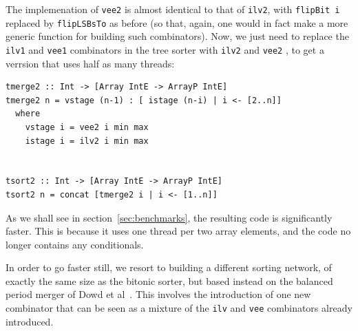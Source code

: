The implemenation of {\tt vee2} is almost identical to
that of {\tt ilv2}, with {\tt flipBit i}
replaced by {\tt flipLSBsTo} as before (so that, again, one would in
fact make a more generic function for building such combinators).
Now, we just need to replace the {\tt ilv1} and {\tt vee1} combinators
in the tree sorter with {\tt ilv2} and {\tt vee2} , to get a verrsion that uses half as many threads:
\begin{codesize}
\begin{verbatim}
tmerge2 :: Int -> [Array IntE -> ArrayP IntE]
tmerge2 n = vstage (n-1) : [ istage (n-i) | i <- [2..n]]
  where
    vstage i = vee2 i min max
    istage i = ilv2 i min max


tsort2 :: Int -> [Array IntE -> ArrayP IntE]
tsort2 n = concat [tmerge2 i | i <- [1..n]]
\end{verbatim}
\end{codesize}
As we shall see in section~\ref{sec:benchmarks}, the resulting code
is significantly faster. This is because it uses one thread per two array elements,
and the code no longer contains any conditionals.

In order to go faster still, we resort to building a different sorting network, of
exactly the same size as the bitonic sorter, but based instead on the balanced period merger of Dowd et al~.
This involves the introduction of one new combinator that can be seen as a mixture
of the {\tt ilv} and {\tt vee} combinators already introduced.

